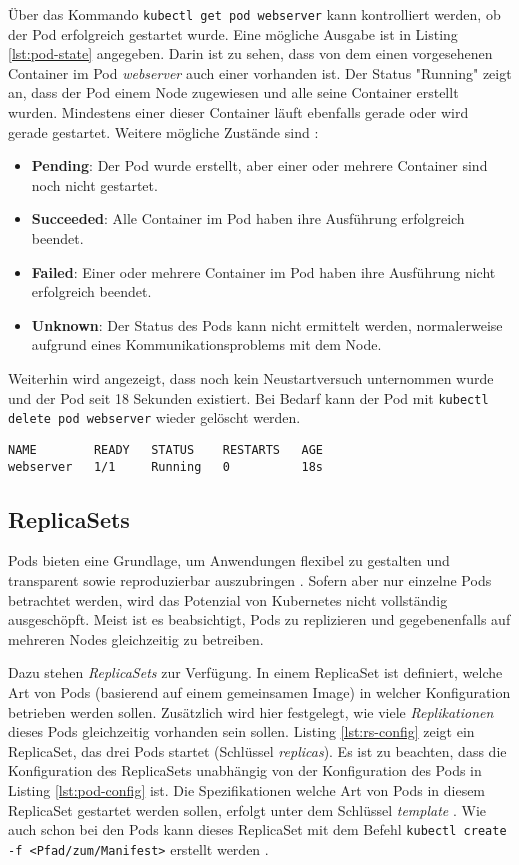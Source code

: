 \documentclass[11pt,a4paper]{article}
\begin{document}
Über das Kommando \lstinline|kubectl get pod webserver| kann kontrolliert werden,
ob der Pod erfolgreich gestartet wurde. Eine mögliche Ausgabe ist in
Listing \ref{lst:pod-state} angegeben. Darin ist zu sehen, dass
von dem einen vorgesehenen Container im Pod \emph{webserver} auch einer vorhanden ist.
Der Status "Running" zeigt an, dass der Pod einem Node zugewiesen und alle seine Container erstellt wurden.
Mindestens einer dieser Container läuft ebenfalls gerade oder wird gerade gestartet.
Weitere mögliche Zustände sind \cite{kubernetes.io_pod_lifecycle}:
\begin{itemize}
    \item \textbf{Pending}: Der Pod wurde erstellt, aber einer oder mehrere Container sind noch nicht gestartet.
    \item \textbf{Succeeded}: Alle Container im Pod haben ihre Ausführung erfolgreich beendet.
    \item \textbf{Failed}: Einer oder mehrere Container im Pod haben ihre Ausführung nicht erfolgreich beendet.
    \item \textbf{Unknown}: Der Status des Pods kann nicht ermittelt werden, normalerweise aufgrund eines Kommunikationsproblems mit dem Node.
\end{itemize}
Weiterhin wird angezeigt, dass noch kein Neustartversuch unternommen wurde
und der Pod seit 18 Sekunden existiert.
Bei Bedarf kann der Pod mit \lstinline|kubectl delete pod webserver| wieder gelöscht werden.

\begin{lstlisting}[caption={Der Pod wurde erfolgreich gestartet.}, label={lst:pod-state}]
NAME        READY   STATUS    RESTARTS   AGE
webserver   1/1     Running   0          18s
\end{lstlisting}

\subsection{ReplicaSets}
Pods bieten eine Grundlage, um Anwendungen flexibel zu gestalten und
transparent sowie reproduzierbar auszubringen \cite{Schmeling_Dargatz_2022}.
Sofern aber nur einzelne Pods betrachtet werden, wird das Potenzial von Kubernetes
nicht vollständig ausgeschöpft.
Meist ist es beabsichtigt, Pods zu replizieren und gegebenenfalls
auf mehreren Nodes gleichzeitig zu betreiben.

Dazu stehen \emph{ReplicaSets} zur Verfügung.
In einem ReplicaSet ist definiert, welche Art von Pods (basierend auf einem gemeinsamen Image)
in welcher Konfiguration betrieben werden sollen. Zusätzlich wird hier festgelegt, wie viele \emph{Replikationen}
dieses Pods gleichzeitig vorhanden sein sollen.
Listing \ref{lst:rs-config} zeigt ein ReplicaSet, das drei Pods startet (Schlüssel \emph{replicas}).
Es ist zu beachten, dass die Konfiguration des ReplicaSets unabhängig von der Konfiguration
des Pods in Listing \ref{lst:pod-config} ist.
Die Spezifikationen welche Art von Pods in diesem ReplicaSet gestartet werden sollen,
erfolgt unter dem Schlüssel \emph{template} \cite{Schmeling_Dargatz_2022}.
Wie auch schon bei den Pods kann dieses ReplicaSet mit dem Befehl
\lstinline|kubectl create -f <Pfad/zum/Manifest>| erstellt werden \cite{Schmeling_Dargatz_2022}.
\end{document}
